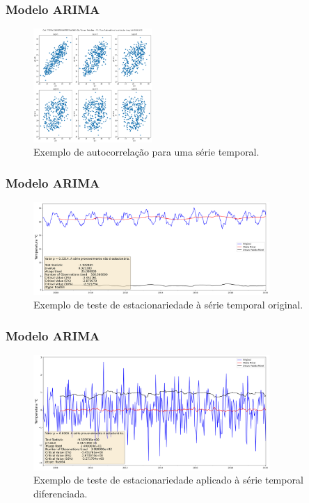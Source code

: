 \documentclass[aspectratio=169]{beamer}
\begin{document}
\begin{frame}
\frametitle{Modelo ARIMA}

\begin{figure}[H]
\centering
\caption{Exemplo de autocorrelação para uma série temporal.}
\includegraphics[width=0.4\textwidth]{figuras/correlacao_712f3e11658051636f09732a60fb3c1b.png}
\end{figure}

\end{frame}

\begin{frame}
\frametitle{Modelo ARIMA}

\begin{figure}[H]
\centering
\caption{Exemplo de teste de estacionariedade à série temporal original.}
\includegraphics[width=0.8\textwidth]{figuras/dickey_fuller_raw_712f3e11658051636f09732a60fb3c1b.png}
\end{figure}

\end{frame}

\begin{frame}
\frametitle{Modelo ARIMA}

\begin{figure}[H]
\centering
\caption{Exemplo de teste de estacionariedade aplicado à série temporal diferenciada.}
\includegraphics[width=0.8\textwidth]{figuras/dickey_fuller_diff_712f3e11658051636f09732a60fb3c1b.png}
\end{figure}

\end{frame}
\end{document}
